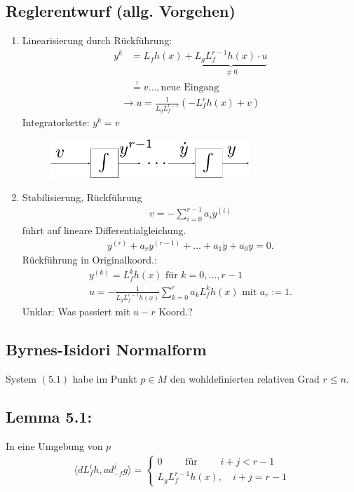 \documentclass[ngerman]{tudscrreprt}
\begin{document}
\subsection*{Reglerentwurf (allg. Vorgehen)}
\begin{enumerate}
\item Linearisierung durch Rückführung: \begin{align*} 
y^{k} &= L_f h(x) + \underbrace{L_gL_f^{r-1} h(x)\cdot u}_{\ne 0} \\ &\overset{!}{=} v\dots,\text{neue Eingang}  \tag{5.2}
\end{align*}
\begin{align*}
\rightarrow u = \frac{1}{L_g L_f^{r-1}}(-L_f^r h(x) + v) \tag{5.3}
\end{align*}
Integratorkette: $y^{k} = v$
\begin{figure}[H]
\centering
\def\svgwidth{200pt} 
  \includegraphics[width=7.5cm]{images/im312.pdf}
\end{figure}
\item Stabilisierung, Rückführung \begin{align*} v = - \sum\limits_{i=0}^{r-1} a_i y^{(i)} \tag{5.4} \end{align*} führt auf lineare Differentialgleichung. \begin{align*} y^{(r)} + a_ry^{(r-1)} + \dots + a_1\dot y + a_0 y = 0. \end{align*}
Rückführung in Originalkoord.: \begin{align*} y^{(k)} = L_f^{k}h(x) \text{ für } k=0,\dots, r-1 \\ 
u = -\frac{1}{L_g L_f^{r-1} h(x)} \sum\limits_{k=0}^{r} a_k L_f^{k} h(x) \text{ mit } a_r:=1. \tag{5.5}
\end{align*}
Unklar: Was passiert mit $u-r$ Koord.?
\end{enumerate} 
\subsection{Byrnes-Isidori Normalform}
System $(5.1)$ habe im Punkt $p\in M$ den wohldefinierten relativen Grad $r\le n.$
\subsection*{Lemma 5.1:} In eine Umgebung von $p$  \begin{align*} \langle dL_f^i h, ad_{-f}^{j}g \rangle = \left\{\substack{0 \qquad \text{ für }\qquad i + j < r-1\\ L_gL_f^{r-1}h(x), \quad i+j = r-1}\right. \tag{5.6}\end{align*}
\end{document}
